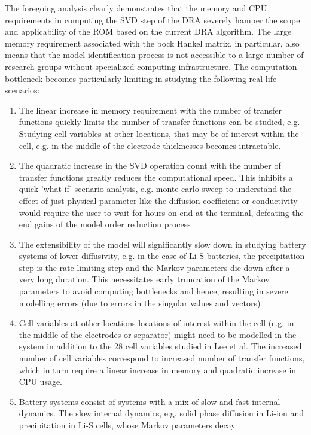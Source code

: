 The foregoing analysis clearly demonstrates that the memory and CPU
requirements in computing the SVD step of the DRA severely hamper
the scope and applicability of the ROM based on the current DRA algorithm.
The large memory requirement associated with the bock Hankel matrix,
in particular, also means that the model identification process is
not accessible to a large number of research groups without specialized
computing infrastructure. The computation bottleneck becomes particularly
limiting in studying the following real-life scenarios:
\begin{enumerate}
\item The linear increase in memory requirement with the number of transfer
functions quickly limits the number of transfer functions can be studied,
e.g. Studying cell-variables at other locations, that may be of interest
within the cell, e.g. in the middle of the electrode thicknesses becomes
intractable.
\item The quadratic increase in the SVD operation count with the number
of transfer functions greatly reduces the computational speed. This
inhibits a quick 'what-if' scenario analysis, e.g. monte-carlo sweep
to understand the effect of just physical parameter like the diffusion
coefficient or conductivity would require the user to wait for hours
on-end at the terminal, defeating the end gains of the model order
reduction process
\item The extensibility of the model will significantly slow down in studying
battery systems of lower diffusivity, e.g. in the case of Li-S batteries,
the precipitation step is the rate-limiting step and the Markov parameters
die down after a very long duration. This necessitates early truncation
of the Markov parameters to avoid computing bottlenecks and hence,
resulting in severe modelling errors (due to errors in the singular
values and vectors)
\item Cell-variables at other locations locations of interest within the
cell (e.g. in the middle of the electrodes or separator) might need
to be modelled in the system in addition to the 28 cell variables
studied in Lee et al. The increased number of cell variables correspond
to increased number of transfer functions, which in turn require a
linear increase in memory and quadratic increase in CPU usage.
\item Battery systems consist of systems with a mix of slow and fast internal
dynamics. The slow internal dynamics, e.g. solid phase diffusion in
Li-ion and precipitation in Li-S cells, whose Markov parameters decay

\end{enumerate}
